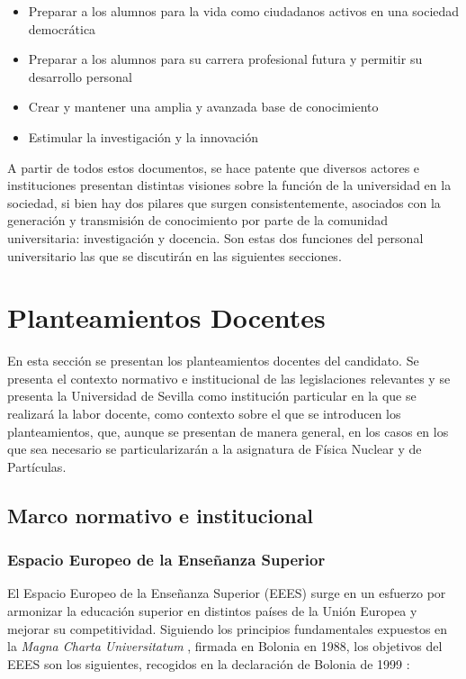 \documentclass[a4paper,12pt,twoside]{article}
\begin{document}
\begin{itemize}
\item  Preparar a los alumnos
para la vida como ciudadanos activos en una sociedad democrática
\item Preparar a los alumnos para su carrera profesional futura y permitir su desarrollo personal
\item Crear y mantener una
amplia y avanzada base de conocimiento
\item Estimular la investigación y la innovación
\end{itemize}

A partir de todos estos documentos, se hace patente que diversos actores e instituciones presentan distintas visiones sobre la función de la universidad en la sociedad, si bien hay dos pilares que surgen consistentemente, asociados con la generación y transmisión de conocimiento por parte de la comunidad universitaria: investigación y docencia. Son estas dos funciones del personal universitario las que se discutirán en las siguientes secciones.

\section{Planteamientos Docentes \label{sec:docente}}

En esta sección se presentan los planteamientos docentes del candidato. Se presenta el contexto normativo e institucional de las legislaciones relevantes y se presenta la Universidad de Sevilla como institución particular en la que se realizará la labor docente, como contexto sobre el que se introducen los planteamientos, que, aunque se presentan de manera general, en los casos en los que sea necesario se particularizarán a la asignatura de Física Nuclear y de Partículas. 

\subsection{Marco normativo e institucional}

\subsubsection{Espacio Europeo de la Enseñanza Superior}

El Espacio Europeo de la Enseñanza Superior (EEES) surge en un esfuerzo por armonizar la educación superior en distintos países de la Unión Europea y mejorar su competitividad. Siguiendo los principios fundamentales expuestos en la \textit{Magna Charta Universitatum} \cite{magna_charta}, firmada en Bolonia en 1988, los objetivos del EEES son los siguientes, recogidos en la declaración de Bolonia de 1999 \cite{bolonia}:
\end{document}
